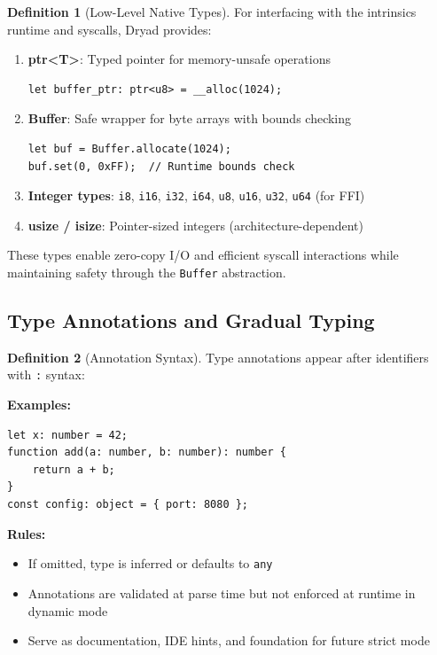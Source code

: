 \documentclass[12pt,a4paper]{article}
\theoremstyle{definition}
\newtheorem{definition}{Definition}[section]
\begin{document}
\begin{definition}[Low-Level Native Types] \label{def:native_types}
For interfacing with the intrinsics runtime and syscalls, Dryad provides:

\begin{enumerate}[leftmargin=*]
    \item \textbf{ptr<T>}: Typed pointer for memory-unsafe operations
    \begin{lstlisting}[language=Dryad]
let buffer_ptr: ptr<u8> = __alloc(1024);
    \end{lstlisting}
    
    \item \textbf{Buffer}: Safe wrapper for byte arrays with bounds checking
    \begin{lstlisting}[language=Dryad]
let buf = Buffer.allocate(1024);
buf.set(0, 0xFF);  // Runtime bounds check
    \end{lstlisting}
    
    \item \textbf{Integer types}: \texttt{i8}, \texttt{i16}, \texttt{i32}, \texttt{i64}, \texttt{u8}, \texttt{u16}, \texttt{u32}, \texttt{u64} (for FFI)
    
    \item \textbf{usize / isize}: Pointer-sized integers (architecture-dependent)
\end{enumerate}

These types enable zero-copy I/O and efficient syscall interactions while maintaining safety through the \texttt{Buffer} abstraction.
\end{definition}

\subsection{Type Annotations and Gradual Typing}

\begin{definition}[Annotation Syntax]
Type annotations appear after identifiers with \texttt{:} syntax:

\textbf{Examples:}
\begin{lstlisting}[language=Dryad]
let x: number = 42;
function add(a: number, b: number): number {
    return a + b;
}
const config: object = { port: 8080 };
\end{lstlisting}

\textbf{Rules:}
\begin{itemize}[leftmargin=*]
    \item If omitted, type is inferred or defaults to \texttt{any}
    \item Annotations are validated at parse time but not enforced at runtime in dynamic mode
    \item Serve as documentation, IDE hints, and foundation for future strict mode
\end{itemize}
\end{definition}
\end{document}
